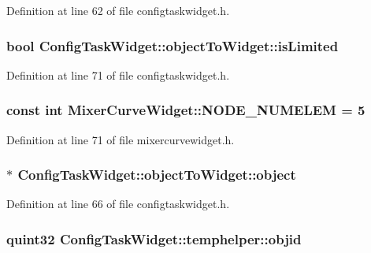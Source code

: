 \-Definition at line 62 of file configtaskwidget.\-h.

\hypertarget{group___u_a_v_object_widget_utils_ga22163ec4275b9b06770d4caead750ee4}{
\subsubsection[{is\-Limited}]{\setlength{\rightskip}{0pt plus 5cm}bool {\bf \-Config\-Task\-Widget\-::object\-To\-Widget\-::is\-Limited}}}\label{group___u_a_v_object_widget_utils_ga22163ec4275b9b06770d4caead750ee4}


\-Definition at line 71 of file configtaskwidget.\-h.

\hypertarget{group___u_a_v_object_widget_utils_ga359d5a2efb6966cba1d78bbdb2e7759d}{
\subsubsection[{\-N\-O\-D\-E\-\_\-\-N\-U\-M\-E\-L\-E\-M}]{\setlength{\rightskip}{0pt plus 5cm}const int {\bf \-Mixer\-Curve\-Widget\-::\-N\-O\-D\-E\-\_\-\-N\-U\-M\-E\-L\-E\-M} = 5}}\label{group___u_a_v_object_widget_utils_ga359d5a2efb6966cba1d78bbdb2e7759d}


\-Definition at line 71 of file mixercurvewidget.\-h.

\hypertarget{group___u_a_v_object_widget_utils_ga0a7a2adb310cdc6b0301dfad762a4f30}{
\subsubsection[{object}]{$\ast$ {\bf \-Config\-Task\-Widget\-::object\-To\-Widget\-::object}}}\label{group___u_a_v_object_widget_utils_ga0a7a2adb310cdc6b0301dfad762a4f30}


\-Definition at line 66 of file configtaskwidget.\-h.

\hypertarget{group___u_a_v_object_widget_utils_ga4c750b1bce138cf6e002f73fca580c4d}{
\subsubsection[{objid}]{\setlength{\rightskip}{0pt plus 5cm}quint32 {\bf \-Config\-Task\-Widget\-::temphelper\-::objid}}}\label{group___u_a_v_object_widget_utils_ga4c750b1bce138cf6e002f73fca580c4d}


